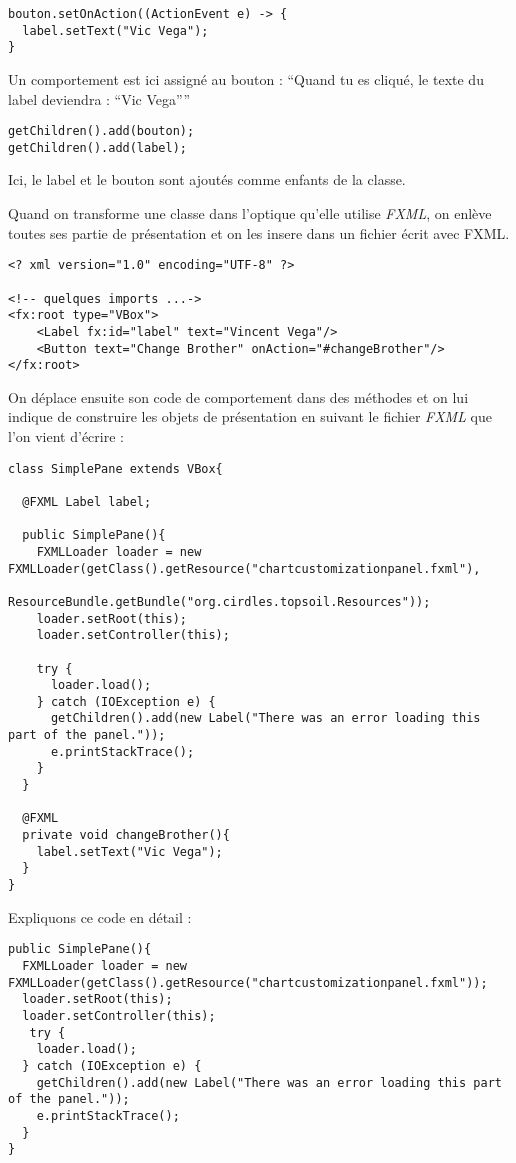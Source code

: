 \begin{verbatim}
bouton.setOnAction((ActionEvent e) -> {
  label.setText("Vic Vega");
}
\end{verbatim}
Un comportement est ici assigné au bouton : ``Quand tu es cliqué, le texte du label deviendra : ``Vic Vega''''

\begin{verbatim}
getChildren().add(bouton);
getChildren().add(label);
\end{verbatim}
Ici, le label et le bouton sont ajoutés comme enfants de la classe.

Quand on transforme une classe dans l'optique qu'elle utilise \textit{FXML}, on enlève toutes ses partie de présentation et on les insere dans un fichier écrit avec FXML.
\begin{verbatim}
<? xml version="1.0" encoding="UTF-8" ?>

<!-- quelques imports ...->
<fx:root type="VBox">
    <Label fx:id="label" text="Vincent Vega"/>
    <Button text="Change Brother" onAction="#changeBrother"/>
</fx:root>
\end{verbatim}

On déplace ensuite son code de comportement dans des méthodes et on lui indique de construire les objets de présentation en suivant le fichier \textit{FXML} que l'on vient d'écrire :
\begin{verbatim}
class SimplePane extends VBox{

  @FXML Label label;

  public SimplePane(){
    FXMLLoader loader = new FXMLLoader(getClass().getResource("chartcustomizationpanel.fxml"),
                                           ResourceBundle.getBundle("org.cirdles.topsoil.Resources"));
    loader.setRoot(this);
    loader.setController(this);

    try {
      loader.load();
    } catch (IOException e) {
      getChildren().add(new Label("There was an error loading this part of the panel."));
      e.printStackTrace();
    }
  }

  @FXML
  private void changeBrother(){
    label.setText("Vic Vega");
  }
}
\end{verbatim}

Expliquons ce code en détail :
\begin{verbatim}
public SimplePane(){
  FXMLLoader loader = new FXMLLoader(getClass().getResource("chartcustomizationpanel.fxml"));
  loader.setRoot(this);
  loader.setController(this);
   try {
    loader.load();
  } catch (IOException e) {
    getChildren().add(new Label("There was an error loading this part of the panel."));
    e.printStackTrace();
  }
}
\end{verbatim}

